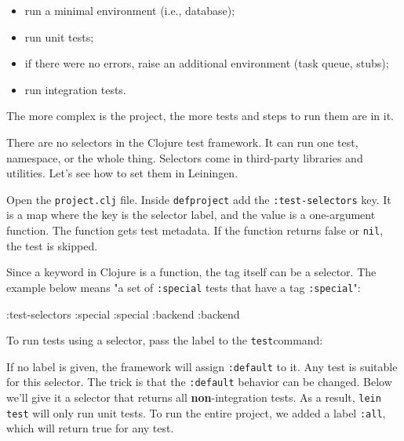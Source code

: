 \begin{itemize}

\item
  run a minimal environment (i.e., database);

\item
  run unit tests;

\item
  if there were no errors, raise an additional environment (task queue, stubs);

\item
  run integration tests.

\end{itemize}

\noindent
The more complex is the project, the more tests and steps to run them are in it.

There are no selectors in the Clojure test framework. It can run one test, namespace, or the whole thing. Selectors come in third-party libraries and utilities. Let's see how to set them in Leiningen.

Open the \verb|project.clj| file. Inside \texttt{def\-pro\-ject} add the \verb|:test-selectors| key. It is a map where the key is the selector label, and the value is a one-argument function. The function gets test metadata. If the function returns false or \verb|nil|, the test is skipped.

Since a keyword in Clojure is a function, the tag itself can be a selector. The example below means "a set of \verb|:special| tests that have a tag \verb|:special|":

\begin{english}
  \begin{clojure}
:test-selectors {:special :special
                 :backend :backend}
  \end{clojure}
\end{english}

\noindent
To run tests using a selector, pass the label to the \verb|test|command: 

\begin{english}
\end{english}


If no label is given, the framework will assign \verb|:default| to it. Any test is suitable for this selector. The trick is that the \verb|:default| behavior can be changed. Below we'll give it a selector that returns all \textbf{non}-integration tests. As a result, \verb|lein test| will only run unit tests. To run the entire project, we added a label \verb|:all|, which will return true for any test.

